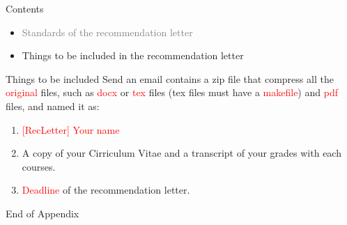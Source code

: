 \documentclass{beamer}
\begin{document}
\begin{frame}{Contents}
\begin{itemize}
\item \textcolor{gray}{Standards of the recommendation letter}
\item Things to be included in the recommendation letter
\end{itemize}
\end{frame}
\begin{frame}{Things to be included}
Send an email contains a zip file that compress all the \textcolor{red}{original} files, such as \textcolor{red}{docx} or \textcolor{red}{tex} files (tex files must have a \textcolor{red}{makefile}) and \textcolor{red}{pdf} files, and named it as: \\
\begin{enumerate}
\item \textcolor{red}{[RecLetter]} \textcolor{red}{Your name}
\item A copy of your Cirriculum Vitae and a transcript of your grades with each courses.
\item \textcolor{red}{Deadline} of the recommendation letter.
\end{enumerate}
\end{frame}
\begin{frame}{}
\begin{center}
\Large{End of Appendix}
\end{center}
\end{frame}
\end{document}
